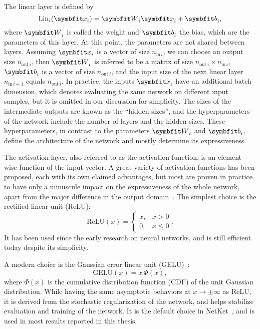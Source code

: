 The linear layer is defined by
\begin{equation}
\text{Lin}_i(\vx_i) = \mW_i \vx_i + \mb_i,
\label{eq:linear-layer}
\end{equation}
where $\mW_i$ is called the weight and $\mb_i$ the bias, which are the parameters of this layer. At this point, the parameters are not shared between layers. Assuming $\vx_i$ is a vector of size $n_{\text{in}\,i}$, we can choose an output size $n_{\text{out}\,i}$, then $\mW_i$ is inferred to be a matrix of size $n_{\text{out}\,i} \times n_{\text{in}\,i}$, $\mb_i$ is a vector of size $n_{\text{out}\,i}$, and the input size of the next linear layer $n_{\text{in}\,i + 1}$ equals $n_{\text{out}\,i}$.
In practice, the inputs $\vx_i$ have an additional batch dimension, which denotes evaluating the same network on different input samples, but it is omitted in our discussion for simplicity. The sizes of the intermediate outputs are known as the ``hidden sizes'', and the hyperparameters of the network include the number of layers and the hidden sizes. These hyperparameters, in contrast to the parameters $\mW_i$ and $\mb_i$, define the architecture of the network and mostly determine its expressiveness.

The activation layer, also referred to as the activation function, is an element-wise function of the input vector. A great variety of activation functions has been proposed, each with its own claimed advantages, but most are proven in practice to have only a minuscule impact on the expressiveness of the whole network, apart from the major difference in the output domain~\cite{kunc2024three}. The simplest choice is the rectified linear unit (ReLU):
\begin{equation}
\text{ReLU}(x) = \begin{cases}
x, & x > 0 \\
0, & x \le 0
\end{cases}.
\end{equation}
It has been used since the early research on neural networks, and is still efficient today despite its simplicity.

A modern choice is the Gaussian error linear unit (GELU)~\cite{hendrycks2016gaussian}:
\begin{equation}
\text{GELU}(x) = x\,\Phi(x),
\end{equation}
where $\Phi(x)$ is the cumulative distribution function (CDF) of the unit Gaussian distribution. While having the same asymptotic behaviors at $x \to \pm \infty$ as ReLU, it is derived from the stochastic regularization of the network, and helps stabilize evaluation and training of the network. It is the default choice in NetKet~\cite{carleo2019netket}, and is used in most results reported in this thesis.

